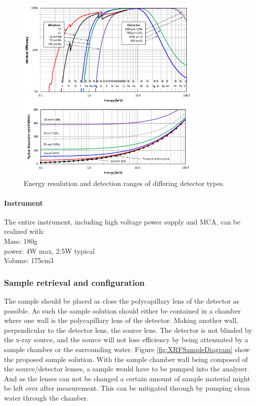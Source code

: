 \begin{figure}[h]
	\centering
	\includegraphics[width=0.8\textwidth]{figures/XRF/EnergyRes.png}
	\caption{Energy resulution and detection ranges of differing detector types.\cite{AmptekDetector}}
	\label{fig:AmptekDetector}
\end{figure}

\paragraph{Instrument}
The entire instrument, including high voltage power supply and MCA, can be realized with\citep{AmptekDetector}:\\
Mass: 180g\\
power: 4W max, 2.5W typical\\
Volume: 175cm3



\subsubsection{Sample retrieval and configuration}
The sample should be placed as close the polycapillary lens of the detector as possible. As such the sample solution should either be contained in a chamber where one wall is the polycapillary lens of the detector. 
Making another wall, perpendicular to the detector lens, the source lens. The detector is not blinded by the x-ray source, and the source will not lose efficiency by being attenuated by a sample chamber or the surrounding water. Figure \ref{fig:XRFSampleDiagram} show the proposed sample solution. With the sample chamber wall being composed of the source/detector lenses, a sample would have to be pumped into the analyser. And as the lenses can not be changed a certain amount of sample material might be left over after measurement. This can be mitigated through by pumping clean water through the chamber.

